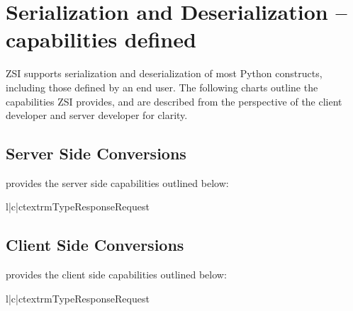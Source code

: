 \chapter{Serialization and Deserialization -- capabilities defined}

ZSI supports serialization and deserialization of most Python constructs, 
including those defined by an end user.  The following charts outline the
capabilities ZSI provides, and are described from the perspective of the
client developer and server developer for clarity.

\section{Server Side Conversions}
 provides the server side capabilities outlined below:

\begin{tableiii}{l|c|c}{textrm}{Type}{Response}{Request}
\end{tableiii}


\section{Client Side Conversions}
 provides the client side capabilities outlined below:

\begin{tableiii}{l|c|c}{textrm}{Type}{Response}{Request}
\end{tableiii}

